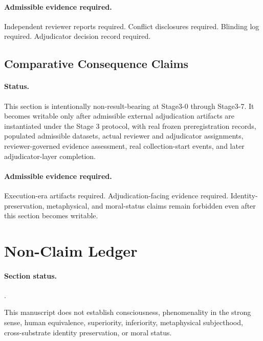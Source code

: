 \documentclass[11pt]{article}
\newcommand{\sectionstatus}[1]{\paragraph{Section status.}\texttt{\detokenize{#1}}.}
\newcommand{\blockedresultstatus}{\paragraph{Status.} This section is intentionally non-result-bearing at Stage3-0 through Stage3-7. It becomes writable only after admissible external adjudication artifacts are instantiated under the Stage 3 protocol, with real frozen preregistration records, populated admissible datasets, actual reviewer and adjudicator assignments, reviewer-governed evidence assessment, real collection-start events, and later adjudicator-layer completion.}
\begin{document}
\paragraph{Admissible evidence required.}
Independent reviewer reports required. Conflict disclosures required. Blinding
log required. Adjudicator decision record required.

\subsection{Comparative Consequence Claims}
\blockedresultstatus

\paragraph{Admissible evidence required.}
Execution-era artifacts required. Adjudication-facing evidence required.
Identity-preservation, metaphysical, and moral-status claims remain forbidden
even after this section becomes writable.

\section{Non-Claim Ledger}
\sectionstatus{formalized}

This manuscript does not establish consciousness, phenomenality in the strong
sense, human equivalence, superiority, inferiority, metaphysical subjecthood,
cross-substrate identity preservation, or moral status.
\end{document}
